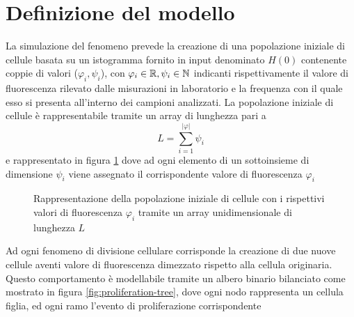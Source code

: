 \section{Definizione del modello}

La simulazione del fenomeno prevede la creazione di una popolazione iniziale
di cellule basata su un istogramma fornito in input denominato $H(0)$
contenente coppie di valori ($\varphi_{i}, \psi_{i}$),
con $\varphi_{i} \in \mathbb{R}, \psi_{i} \in \mathbb{N}$ indicanti rispettivamente il
valore di fluorescenza rilevato dalle misurazioni in laboratorio e
la frequenza con il quale esso si presenta all'interno dei campioni analizzati.
La popolazione iniziale di cellule è rappresentabile tramite un array di
lunghezza pari a $$L = \sum_{i=1}^{|\varphi|} \psi_{i}$$
e rappresentato in figura \ref{fig:population-array} dove ad ogni elemento
di un sottoinsieme di dimensione $\psi_{i}$ viene assegnato il corrispondente
valore di fluorescenza $\varphi_{i}$
\\
\begin{figure}[H]
\centering
{}
\caption{Rappresentazione della popolazione iniziale di cellule con i rispettivi
    valori di fluorescenza $\varphi_{i}$ tramite un array unidimensionale
    di lunghezza $L$}
\label{fig:population-array}
\end{figure}

Ad ogni fenomeno di divisione cellulare corrisponde
la creazione di due nuove cellule aventi valore di fluorescenza dimezzato
rispetto alla cellula originaria.
Questo comportamento è modellabile tramite un albero binario bilanciato
come mostrato in figura \ref{fig:proliferation-tree}, dove ogni nodo rappresenta
un cellula figlia, ed ogni ramo l'evento di proliferazione corrispondente

